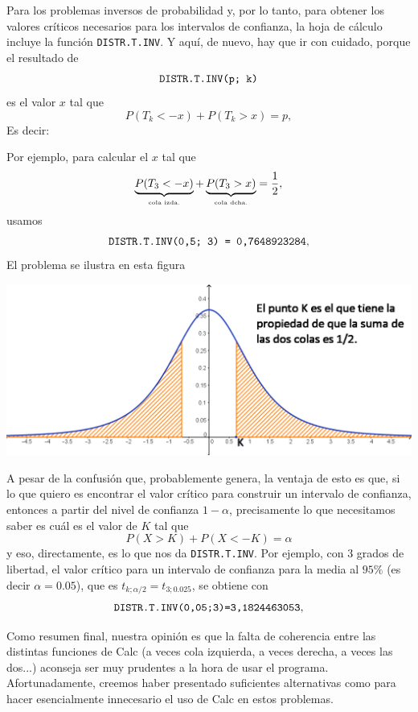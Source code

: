 \documentclass[10pt,a4paper]{article}\usepackage[]{graphicx}\usepackage[]{color}
\newcounter {cont01}
\begin{document}
Para los problemas inversos de probabilidad y, por lo tanto, para obtener los valores críticos necesarios para los intervalos de confianza, la hoja de cálculo incluye la función {\tt DISTR.T.INV}. Y aquí, de nuevo, hay que ir con cuidado, porque el resultado de
    \[\mbox{\tt DISTR.T.INV(p; k)}\]
es el valor $x$ tal que
    \[P(T_k < -x) + P(T_k > x)  = p,\]
Es decir:
    \begin{center}
    \end{center}
Por ejemplo, para calcular el $x$ tal que
    \[\underbrace{P(T_3 < -x)}_{\mbox{\tiny cola izda.}}+\underbrace{P(T_3 > x)}_{\mbox{\tiny cola dcha.}}=\frac{1}{2},\]
usamos
         \[\mbox{\tt DISTR.T.INV(0,5; 3) = 0,7648923284},\]
El problema se ilustra en esta figura
    \begin{center}
    \includegraphics[width=15cm]{../fig/Tut06-14.png}
    \end{center}
A pesar de la confusión que, probablemente genera, la ventaja de esto es que, si lo que quiero es encontrar el valor crítico para construir un intervalo de confianza, entonces a partir del nivel de confianza $1-\alpha$, precisamente lo que necesitamos saber es cuál es el valor de $K$ tal que
    \[P(X>K)+P(X<-K)=\alpha\]
y eso, directamente, es lo que nos da {\tt DISTR.T.INV}. Por ejemplo, con $3$ grados de libertad, el valor crítico para un intervalo de confianza  para la media al $95\%$ (es decir $\alpha=0.05$), que es $t_{k;\alpha/2}=t_{3;0.025}$, se obtiene con
    \[\mbox{\tt DISTR.T.INV(0,05;3)=3,1824463053},\]


Como resumen final, nuestra opinión es que la falta de coherencia entre las distintas funciones de Calc (a veces cola izquierda, a veces derecha, a veces las dos...) aconseja ser muy prudentes a la hora de usar el programa. Afortunadamente, creemos haber presentado suficientes alternativas como para hacer esencialmente innecesario el uso de Calc en estos problemas.
\end{document}
